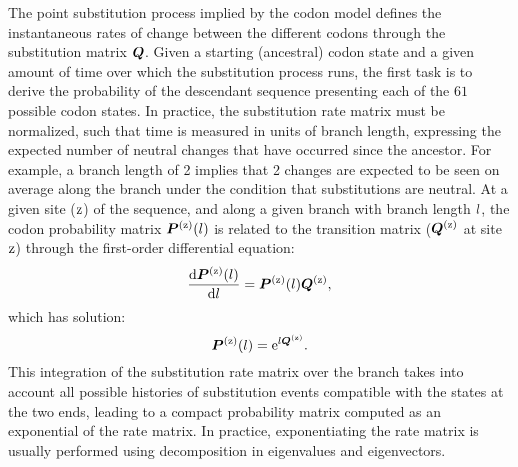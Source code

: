 The point substitution process implied by the codon model defines the instantaneous rates of change between the different codons through the substitution matrix $\bm{Q}$.
Given a starting (ancestral) codon state and a given amount of time over which the substitution process runs, the first task is to derive the probability of the descendant sequence presenting each of the $61$ possible codon states.
In practice, the substitution rate matrix must be normalized, such that time is measured in units of branch length, expressing the expected number of neutral changes that have occurred since the ancestor.
For example, a branch length of 2 implies that 2 changes are expected to be seen on average along the branch under the condition that substitutions are neutral.
At a given site ($\text{z}$) of the sequence, and along a given branch with branch length $l$, the codon probability matrix $\bm{P}^{(\text{z})}(l)$ is related to the transition matrix ($\bm{Q}^{(\text{z})}$ at site $\text{z}$) through the first-order differential equation:
\begin{equation}
    \dfrac{\mathrm{d} \bm{P}^{(\text{z})}(l)}{\mathrm{d} l} = \bm{P}^{(\text{z})}(l) \bm{Q}^{(\text{z})},
\end{equation}
which has solution:
\begin{equation}
    \bm{P}^{(\text{z})}(l) = \text{e}^{l \bm{Q}^{(\text{z})}}.
\end{equation}
This integration of the substitution rate matrix over the branch takes into account all possible histories of substitution events compatible with the states at the two ends, leading to a compact probability matrix computed as an exponential of the rate matrix.
In practice, exponentiating the rate matrix is usually performed using decomposition in eigenvalues and eigenvectors.

